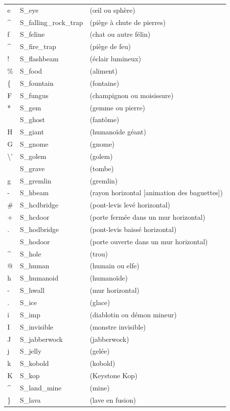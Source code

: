 \documentclass[titlepage]{article}
\begin{document}
\begin{longtable}{lll}
e & S\_eye & (œil ou sphère)\\
\textasciicircum{} & S\_falling\_rock\_trap & (piège à chute de pierres)\\
f & S\_feline & (chat ou autre félin)\\
\textasciicircum{} & S\_fire\_trap & (piège de feu)\\
! & S\_flashbeam & (éclair lumineux)\\
\% & S\_food & (aliment)\\
\{ & S\_fountain & (fontaine)\\
F & S\_fungus & (champignon ou moisissure)\\
* & S\_gem & (gemme ou pierre)\\
~ & S\_ghost & (fantôme)\\
H & S\_giant & (humanoïde géant)\\
G & S\_gnome & (gnome)\\
\textbackslash{}' & S\_golem & (golem)\\
\textbar{} & S\_grave & (tombe)\\
g & S\_gremlin & (gremlin)\\
- & S\_hbeam & (rayon horizontal [animation des baguettes])\\
\# & S\_hcdbridge & (pont-levis levé horizontal)\\
+ & S\_hcdoor & (porte fermée dans un mur horizontal)\\
. & S\_hodbridge & (pont-levis baissé horizontal)\\
\textbar{} & S\_hodoor & (porte ouverte dans un mur horizontal)\\
\textasciicircum{} & S\_hole & (trou)\\
@ & S\_human & (humain ou elfe)\\
h & S\_humanoid & (humanoïde)\\
- & S\_hwall & (mur horizontal)\\
. & S\_ice & (glace)\\
i & S\_imp & (diablotin ou démon mineur)\\
I & S\_invisible & (monstre invisible)\\
J & S\_jabberwock & (jabberwock)\\
j & S\_jelly & (gelée)\\
k & S\_kobold & (kobold)\\
K & S\_kop & (Keystone Kop)\\
\textasciicircum{} & S\_land\_mine & (mine)\\
\} & S\_lava & (lave en fusion)\\

\end{longtable}
\end{document}
